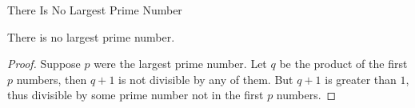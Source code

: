 \begin{frame}{There Is No Largest Prime Number}

\begin{theorem}
    There is no largest prime number.
\end{theorem}

\begin{proof}
    Suppose $p$ were the largest prime number.
    Let $q$ be the product of the first $p$ numbers, then $q + 1$ is not
    divisible by any of them.
    But $q + 1$ is greater than $1$, thus divisible by some prime number
    not in the first $p$ numbers.\qedhere
\end{proof}
\end{frame}
